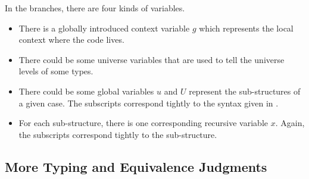 In the branches, there are four kinds of variables.
\begin{itemize}
\item There is a globally introduced context variable $g$ which represents the
  local context where the code lives.
\item There could be some universe variables that are used to tell the universe levels
  of some types.
\item There could be some global variables $u$ and $U$ represent the sub-structures of
  a given case. %
  The subscripts correspond tightly to the syntax given in .
\item For each sub-structure, there is one corresponding recursive variable $x$. %
  Again, the subscripts correspond tightly to the sub-structure. 
\end{itemize}

\subsection{More Typing and Equivalence Judgments}

